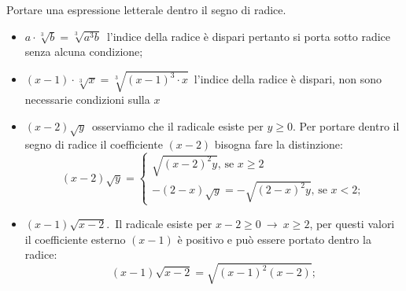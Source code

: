  \begin{esempio}
 Portare una espressione letterale dentro il segno di radice.
 \begin{itemize}
 \item $a\cdot \sqrt[3]b=\sqrt[3]{a^3b}$\, l'indice della radice è dispari 
  pertanto si porta sotto radice senza alcuna condizione;
 \item $(x-1)\cdot \sqrt[3]x=\sqrt[3]{(x-1)^3\cdot x}$\, l'indice della radice 
  è dispari, non sono necessarie condizioni sulla $x$
 \item $(x-2)\sqrt y$\, osserviamo che il radicale esiste per $y\ge 0$.
  Per portare dentro il segno di radice il coefficiente $(x-2)$ bisogna fare 
  la distinzione:
 \[
 (x-2)\sqrt y=\left\{\begin{array}{l}\sqrt{(x-2)^2y}\text{, se }x\ge 2\\
 -(2-x)\sqrt y=-\sqrt{(2-x)^2y}\text{, se }x<2;\end{array}\right.
 \]
 \item $(x-1)\sqrt{x-2}$.\, Il radicale esiste per $x-2\ge 0\ \to \ x\ge 2$, 
 per questi valori il coefficiente esterno $(x-1)$ è positivo e può essere 
 portato dentro la radice: \[(x-1)\sqrt{x-2}=\sqrt{(x-1)^2(x-2)};\]
% 
% 
% 
% 
 \end{itemize}
 \end{esempio}

